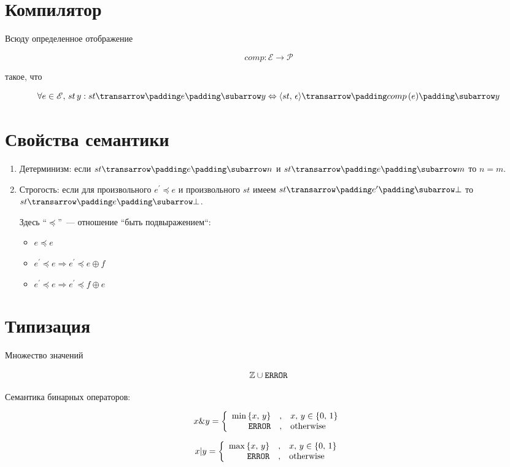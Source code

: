 \section{Компилятор}

Всюду определенное отображение

\[
comp : \mathscr{E}\to \mathscr{P}
\]

такое, что

\[
\forall e\in\mathscr E,\,st\,y : \trans{st}{e}{y} \Leftrightarrow \trans{\inbr{st,\,\epsilon}}{comp\,(e)}{y}
\]

\section{Свойства семантики}

\begin{enumerate}
\item Детерминизм: если $\trans{st}{e}{n}$ и $\trans{st}{e}{m}$ то $n=m$.

\item Строгость: если для произвольного $e^\prime\preceq e$ и произвольного $st$
имеем $\trans{st}{e^\prime}{\bot}$ то $\trans{st}{e}{\bot}$.

  Здесь ``$\preceq$''~--- отношение ``быть подвыражением``:

  \begin{itemize}
  \item $e\preceq e$
  \item $e^\prime\preceq e \Rightarrow e^\prime\preceq e\oplus f$
  \item $e^\prime\preceq e \Rightarrow e^\prime\preceq f\oplus e$
  \end{itemize}
\end{enumerate}

\section{Типизация}

Множество значений

\[
\mathbb{Z}\cup\mbox{\texttt{ERROR}}
\]

Семантика бинарных операторов:

\[
x \& y = \left\{
\begin{array}{rcl}
  \min\,\{x,\,y\} &, &x,\,y\in\{0,\,1\}\\
  \mbox{\texttt{ERROR}}&,&\mbox{otherwise}
\end{array}
\right.
\]

\[
x | y = \left\{
\begin{array}{rcl}
  \max\,\{x,\,y\} &, &x,\,y\in\{0,\,1\}\\
  \mbox{\texttt{ERROR}}&,&\mbox{otherwise}
\end{array}
\right.
\]

